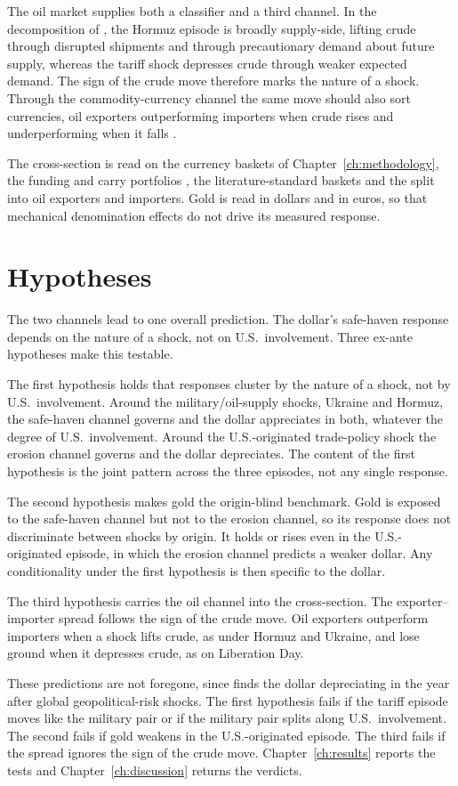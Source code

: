 The oil market supplies both a classifier and a third channel. In the decomposition of \textcite{kilian_2009}, the Hormuz episode is broadly supply-side, lifting crude through disrupted shipments and through precautionary demand about future supply, whereas the tariff shock depresses crude through weaker expected demand. The sign of the crude move therefore marks the nature of a shock. Through the commodity-currency channel the same move should also sort currencies, oil exporters outperforming importers when crude rises and underperforming when it falls \parencite{chen_rogoff_2003,chen_liu_wang_zhu_2016}.

The cross-section is read on the currency baskets of Chapter~\ref{ch:methodology}, the funding and carry portfolios \parencite{lustig_roussanov_verdelhan_2011}, the literature-standard baskets and the split into oil exporters and importers. Gold is read in dollars and in euros, so that mechanical denomination effects do not drive its measured response.

\section{Hypotheses}
\label{sec:hypotheses}

The two channels lead to one overall prediction. The dollar's safe-haven response depends on the nature of a shock, not on U.S.\ involvement. Three ex-ante hypotheses make this testable.

The first hypothesis holds that responses cluster by the nature of a shock, not by U.S.\ involvement. Around the military/oil-supply shocks, Ukraine and Hormuz, the safe-haven channel governs and the dollar appreciates in both, whatever the degree of U.S.\ involvement. Around the U.S.-originated trade-policy shock the erosion channel governs and the dollar depreciates. The content of the first hypothesis is the joint pattern across the three episodes, not any single response.

The second hypothesis makes gold the origin-blind benchmark. Gold is exposed to the safe-haven channel but not to the erosion channel, so its response does not discriminate between shocks by origin. It holds or rises even in the U.S.-originated episode, in which the erosion channel predicts a weaker dollar. Any conditionality under the first hypothesis is then specific to the dollar.

The third hypothesis carries the oil channel into the cross-section. The exporter--importer spread follows the sign of the crude move. Oil exporters outperform importers when a shock lifts crude, as under Hormuz and Ukraine, and lose ground when it depresses crude, as on Liberation Day.

These predictions are not foregone, since \textcite{yilmazkuday_2025} finds the dollar depreciating in the year after global geopolitical-risk shocks. The first hypothesis fails if the tariff episode moves like the military pair or if the military pair splits along U.S.\ involvement. The second fails if gold weakens in the U.S.-originated episode. The third fails if the spread ignores the sign of the crude move. Chapter~\ref{ch:results} reports the tests and Chapter~\ref{ch:discussion} returns the verdicts.